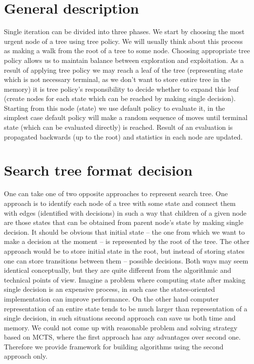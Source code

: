 \section{General description}
Single iteration can be divided into three phases.
We start by choosing the most urgent node of a tree using tree policy. We will
usually think about this process as making a walk from the root of a tree to
some node. Choosing appropriate tree policy allows us to maintain balance
between exploration and exploitation.
As a result of applying tree policy we may reach a leaf of the tree
(representing state which is not necessary terminal, as we don't want to store
entire tree in the memory) it is tree policy's responsibility to decide whether
to expand this leaf (create nodes for each state which can be reached by making
single decision).
Starting from this node (state) we use default policy to evaluate it, in the
simplest case default policy will make a random sequence of moves until
terminal state (which can be evaluated directly) is reached.
Result of an evaluation is propagated backwards (up to the root) and statistics
in each node are updated.

\section{Search tree format decision}
One can take one of two opposite approaches to represent search tree.
One approach is to identify each node of a tree with some state and connect
them with edges (identified with decisions) in such a way that children of a
given node are those states that can be obtained from parent node's state by
making single decision. It should be obvious that initial state -- the one from
which we want to make a decision at the moment -- is represented by the root of
the tree.
The other approach would be to store initial state in the root, but instead of
storing states one can store transitions between them -- possible decisions.
Both ways may seem identical conceptually, but they are quite different from
the algorithmic and technical points of view.
Imagine a problem where computing state after making single decision is an
expensive process, in such case the states-oriented implementation can improve
performance. On the other hand computer representation of an entire state tends
to be much larger than representation of a single decision, in such situations
second approach can save us both time and memory.
We could not come up with reasonable problem and solving strategy based on
MCTS, where the first approach has any advantages over second one. Therefore we
provide framework for building algorithms using the second approach only.

